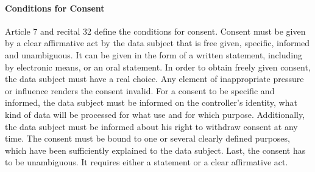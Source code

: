 \paragraph{Conditions for Consent} Article 7 and recital 32 define the conditions for consent. Consent must be given by a clear affirmative act by the data subject that is free given, specific, informed and unambiguous. It can be given in the form of a written statement, including by electronic means, or an oral statement. In order to obtain freely given consent, the data subject must have a real choice. Any element of inappropriate pressure or influence renders the consent invalid. For a consent to be specific and informed, the data subject must be informed on the controller’s identity, what kind of data will be processed for what use and for which purpose. Additionally, the data subject must be informed about his right to withdraw consent at any time. The consent must be bound to one or several clearly defined purposes, which have been sufficiently explained to the data subject. Last, the consent has to be unambiguous. It requires either a statement or a clear affirmative act.\cite{GDPR7}\cite{GDPRrec32}


